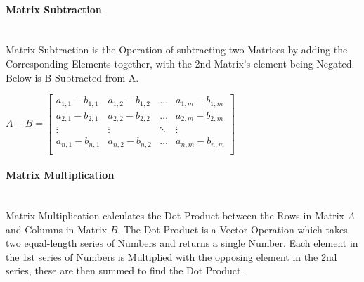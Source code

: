 \begin{flushleft}
                \paragraph{Matrix Subtraction} \mbox{} \\
                    \vspace{0.2cm}
                    Matrix Subtraction is the Operation of subtracting two Matrices by adding the Corresponding Elements together, with the 2nd Matrix's element 
                    being Negated. Below is B Subtracted from A. \\

                    \begin{center}
                        $
                        A - B =
                        \begin{bmatrix}
                            a_{1,1} - b_{1,1} & a_{1,2} - b_{1,2} & \hdots  & a_{1,m} - b_{1,m} \\
                            a_{2,1} - b_{2,1} & a_{2,2} - b_{2,2} & \hdots  & a_{2,m} - b_{2,m} \\
                            \vdots            & \vdots            & \ddots  & \vdots            \\
                            a_{n,1} - b_{n,1} & a_{n,2} - b_{n,2} & \hdots  & a_{n,m} - b_{n,m} \\
                        \end{bmatrix}
                        $
                    \end{center}

                \paragraph{Matrix Multiplication} \mbox{} \\
                    \vspace{0.2cm}
                    Matrix Multiplication calculates the Dot Product between the Rows in Matrix $A$ and Columns in Matrix $B$. The Dot Product is a Vector Operation
                    which takes two equal-length series of Numbers and returns a single Number. Each element in the 1st series of Numbers is Multiplied with the opposing element
                    in the 2nd series, these are then summed to find the Dot Product. \\


\end{flushleft}
